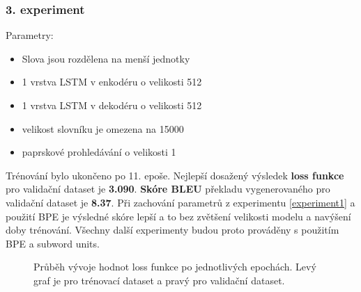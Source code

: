 \subsubsection{3. experiment}\label{experiment3}
Parametry:
\begin{itemize}
  \item Slova jsou rozdělena na menší jednotky
  \item 1 vrstva LSTM v enkodéru o velikosti 512
  \item 1 vrstva LSTM v dekodéru o velikosti 512
  \item velikost slovníku je omezena na 15000
  \item paprskové prohledávání o velikosti 1
\end{itemize}

Trénování bylo ukončeno po 11. epoše. Nejlepší dosažený výsledek \textbf{loss funkce} pro validační dataset je \textbf{3.090}. \textbf{Skóre BLEU} překladu vygenerovaného pro validační dataset je \textbf{8.37}. Při zachování parametrů z experimentu \ref{experiment1} a použití BPE je výsledné skóre lepší a to bez zvětšení velikosti modelu a navýšení doby trénování. Všechny další experimenty budou proto prováděny s použitím BPE a subword units.

\begin{figure}[H]
    \begin{center}
    \end{center}
	\caption{Průběh vývoje hodnot loss funkce po jednotlivých epochách. Levý graf je pro trénovací dataset a pravý pro validační dataset.}
\end{figure}

